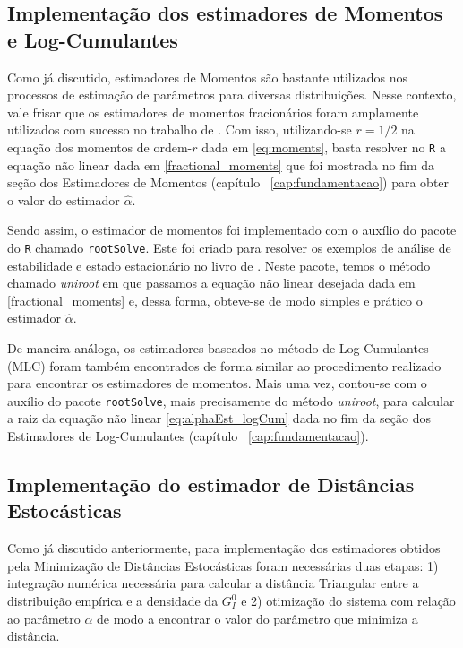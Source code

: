 \subsection{Implementação dos estimadores de Momentos e Log-Cumulantes}

Como já discutido, estimadores de Momentos são bastante utilizados nos processos de estimação de parâmetros para diversas distribuições. Nesse contexto, vale frisar que os estimadores de momentos fracionários foram amplamente utilizados com sucesso no trabalho de \citet{Clutter1997}. Com isso, utilizando-se $r = 1/2$ na equação dos momentos de ordem-$r$ dada em \eqref{eq:moments}, basta resolver no \texttt{R} a equação não linear dada em \eqref{fractional_moments} que foi mostrada no fim da seção dos Estimadores de Momentos (capítulo ~\ref{cap:fundamentacao}) para obter o valor do estimador $\widehat{\alpha}$.

Sendo assim, o estimador de momentos foi implementado com o auxílio do pacote do \texttt{R} chamado \texttt{rootSolve}. Este foi criado para resolver os exemplos de análise de estabilidade e estado estacionário no livro de \citet{Soetaert2009}. Neste pacote, temos o método chamado \textit{uniroot} em que passamos a equação não linear desejada dada em \eqref{fractional_moments} e, dessa forma, obteve-se de modo simples e prático o estimador $\widehat{\alpha}$.

De maneira análoga, os estimadores baseados no método de Log-Cumulantes (MLC) foram também encontrados de forma similar ao procedimento realizado para encontrar os estimadores de momentos. Mais uma vez, contou-se com o auxílio do pacote \texttt{rootSolve}, mais precisamente do método \emph{uniroot}, para calcular a raiz da equação não linear \eqref{eq:alphaEst_logCum} dada no fim da seção dos Estimadores de Log-Cumulantes (capítulo ~\ref{cap:fundamentacao}).

\subsection{Implementação do estimador de Distâncias Estocásticas}

Como já discutido anteriormente, para implementação dos estimadores obtidos pela Minimização de Distâncias Estocásticas foram necessárias duas etapas: 1) integração numérica necessária para calcular a distância Triangular entre a distribuição empírica e a densidade da $G_I^0$ e 2) otimização do sistema com relação ao parâmetro $\alpha$ de modo a encontrar o valor do parâmetro que minimiza a distância.


